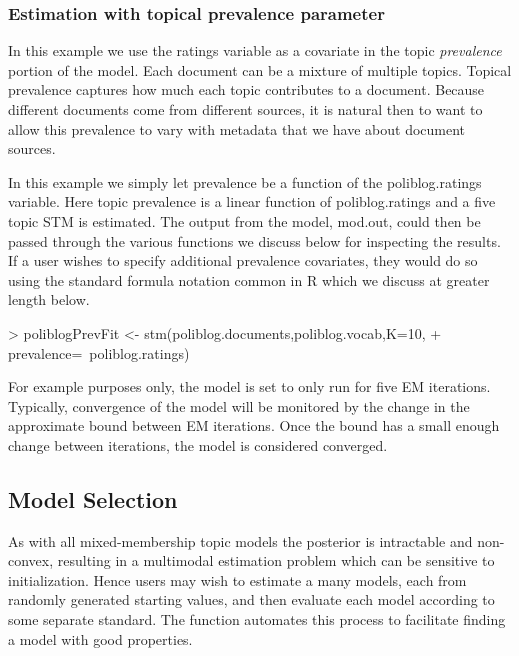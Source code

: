 \documentclass[nojss]{jss}
\begin{document}
\subsubsection{Estimation with topical prevalence parameter}

In this example we use the ratings variable as a covariate in the topic \emph{prevalence} portion of the model. Each document can be a mixture of multiple topics. Topical prevalence captures how much each topic contributes to a document. Because different documents come from different sources, it is natural then to want to allow this prevalence to vary with metadata that we have about document sources.


In this example we simply let prevalence be a function of the poliblog.ratings variable. Here topic prevalence is a linear function of poliblog.ratings and a five topic STM is estimated. The output from the model, mod.out, could then be passed through the various functions we discuss below for inspecting the results. If a user wishes to specify additional prevalence covariates, they would do so using the standard formula notation common in R which we discuss at greater length below.
\begin{Schunk}
\begin{Sinput}
> poliblogPrevFit <- stm(poliblog.documents,poliblog.vocab,K=10,
+                    prevalence=~poliblog.ratings)
\end{Sinput}
\end{Schunk}

For example purposes only, the model is set to only run for five EM iterations.  Typically, convergence of the model will be monitored by the change in the approximate bound between EM iterations.  Once the bound has a small enough change between iterations, the model is considered converged.

\subsection{Model Selection}

As with all mixed-membership topic models the posterior is intractable and non-convex, resulting in a multimodal estimation problem which can be sensitive to initialization. Hence users may wish to estimate a many models, each from randomly generated starting values, and then evaluate each model according to some separate standard. The function  automates this process to facilitate finding a model with good properties.
\end{document}
